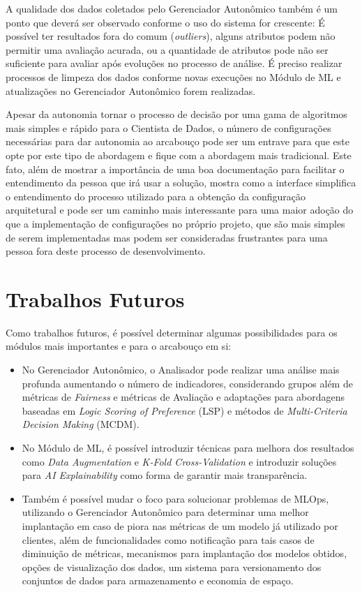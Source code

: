 \documentclass[portugues]{ic-tese}
\begin{document}
A qualidade dos dados coletados pelo Gerenciador Autonômico também é um ponto que deverá ser observado conforme o uso do sistema for crescente: É possível ter resultados fora do comum (\textit{outliers}), alguns atributos podem não permitir uma avaliação acurada, ou a quantidade de atributos pode não ser suficiente para avaliar após evoluções no processo de análise. É preciso realizar processos de limpeza dos dados conforme novas execuções no Módulo de ML e atualizações no Gerenciador Autonômico forem realizadas.

Apesar da autonomia tornar o processo de decisão por uma gama de algoritmos mais simples e rápido para o Cientista de Dados, o número de configurações necessárias para dar autonomia ao arcabouço pode ser um entrave para que este opte por este tipo de abordagem e fique com a abordagem mais tradicional. Este fato, além de mostrar a importância de uma boa documentação para facilitar o entendimento da pessoa que irá usar a solução, mostra como a interface simplifica o entendimento do processo utilizado para a obtenção da configuração arquitetural e pode ser um caminho mais interessante para uma maior adoção do que a implementação de configurações no próprio projeto, que são mais simples de serem implementadas mas podem ser consideradas frustrantes para uma pessoa fora deste processo de desenvolvimento. 

\section{Trabalhos Futuros}

Como trabalhos futuros, é possível determinar algumas possibilidades para os módulos mais importantes e para o arcabouço em si:

\begin{itemize}
\item No Gerenciador Autonômico, o Analisador pode realizar uma análise mais profunda aumentando o número de indicadores, considerando grupos além de métricas de \textit{Fairness} e métricas de Avaliação e adaptações para abordagens baseadas em \textit{Logic Scoring of Preference} (LSP) e métodos de \textit{Multi-Criteria Decision Making} (MCDM). 

\item No Módulo de ML, é possível introduzir técnicas para melhora dos resultados como \textit{Data Augmentation} e \textit{K-Fold Cross-Validation} e introduzir soluções para \textit{AI Explainability} como forma de garantir mais transparência. 

\item Também é possível mudar o foco para solucionar problemas de MLOps, utilizando o Gerenciador Autonômico para determinar uma melhor implantação em caso de piora nas métricas de um modelo já utilizado por clientes, além de funcionalidades como notificação para tais casos de diminuição de métricas, mecanismos para implantação dos modelos obtidos, opções de visualização dos dados, um sistema para versionamento dos conjuntos de dados para armazenamento e economia de espaço.
\end{itemize}
\end{document}
